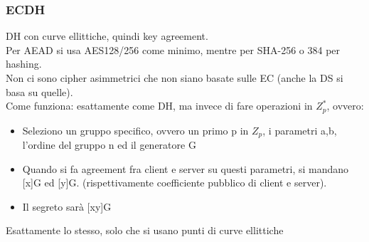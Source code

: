 \documentclass[16px]{article}
\begin{document}
\subsubsection{ECDH}
DH con curve ellittiche, quindi key agreement.\\ Per AEAD si usa AES128/256 come minimo, mentre per SHA-256 o 384 per hashing.\\ Non ci sono cipher asimmetrici che non siano basate sulle EC (anche la DS si basa su quelle).\\ Come funziona: esattamente come DH, ma invece  di fare operazioni in $Z_p^*$, ovvero:
\begin{itemize}
\item Seleziono un gruppo specifico, ovvero un primo p in $Z_p$, i parametri a,b, l'ordine del gruppo n ed il generatore G
\item Quando si fa agreement fra client e server su questi parametri, si mandano [x]G ed [y]G. (rispettivamente coefficiente pubblico di client e server).
\item Il segreto sarà [xy]G
\end{itemize}
Esattamente lo stesso, solo che si usano punti di curve ellittiche
\end{document}
